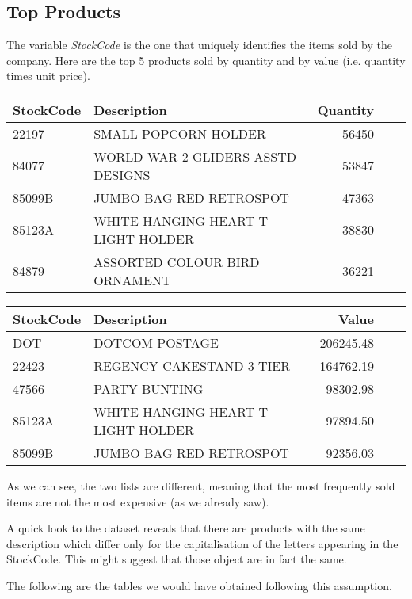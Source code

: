 \documentclass[12pt,a4paper,oneside,italian]{book}\usepackage{knitr}
\begin{document}
\subsection*{Top Products}


The variable \textit{StockCode} is the one that uniquely identifies the items sold by the company. Here are the top 5 products sold by quantity and by value (i.e. quantity times unit price).

\begin{table}[H]
\centering
\begin{tabular}{llrlr}
\toprule
StockCode & Description & Quantity\\
\midrule
22197 & SMALL POPCORN HOLDER & 56450\\
84077 & WORLD WAR 2 GLIDERS ASSTD DESIGNS & 53847\\
85099B & JUMBO BAG RED RETROSPOT & 47363\\
85123A & WHITE HANGING HEART T-LIGHT HOLDER & 38830\\
84879 & ASSORTED COLOUR BIRD ORNAMENT & 36221\\
\bottomrule
\end{tabular}
\end{table}

\begin{table}[H]
\centering
\begin{tabular}{llrlr}
\toprule
StockCode & Description & Value\\
\midrule
DOT & DOTCOM POSTAGE & 206245.48\\
22423 & REGENCY CAKESTAND 3 TIER & 164762.19\\
47566 & PARTY BUNTING & 98302.98\\
85123A & WHITE HANGING HEART T-LIGHT HOLDER & 97894.50\\
85099B & JUMBO BAG RED RETROSPOT & 92356.03\\
\bottomrule
\end{tabular}
\end{table}




As we can see, the two lists are different, meaning that the most frequently sold items are not the most expensive (as we already saw).


A quick look to the dataset reveals that there are products with the same description which differ only for the capitalisation of the letters appearing in the StockCode. This might suggest that those object are in fact the same.

The following are the tables we would have obtained following this assumption.
\end{document}
